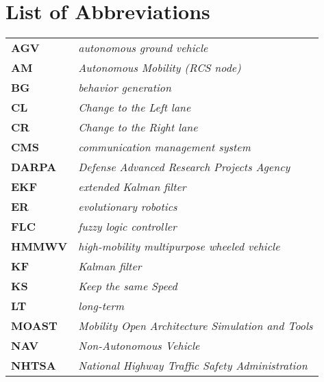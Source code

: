 \chapter*{List of Abbreviations}

\begin{table}[h!t!]
\begin{center}
\begin{small}
\begin{tabular}[t]{ll}
\textbf{\color{Black}AGV} & \textit{\color{DefColor}autonomous ground vehicle}\\
\textbf{\color{Black}AM} & \textit{\color{DefColor}Autonomous Mobility (RCS node)}\\
\textbf{\color{Black}BG} & \textit{\color{DefColor}behavior generation}\\
\textbf{\color{Black}CL} & \textit{\color{DefColor}Change to the Left lane}\\
\textbf{\color{Black}CR} & \textit{\color{DefColor}Change to the Right lane}\\
\textbf{\color{Black}CMS} & \textit{\color{DefColor}communication management system}\\
\textbf{\color{Black}DARPA} & \textit{\color{DefColor}Defense Advanced Research Projects Agency}\\
\textbf{\color{Black}EKF} & \textit{\color{DefColor}extended Kalman filter}\\
\textbf{\color{Black}ER} & \textit{\color{DefColor}evolutionary robotics}\\
\textbf{\color{Black}FLC} & \textit{\color{DefColor}fuzzy logic controller}\\
\textbf{\color{Black}HMMWV} & \textit{\color{DefColor}high-mobility multipurpose wheeled vehicle}\\
\textbf{\color{Black}KF} & \textit{\color{DefColor}Kalman filter}\\
\textbf{\color{Black}KS} & \textit{\color{DefColor}Keep the same Speed}\\
\textbf{\color{Black}LT} & \textit{\color{DefColor}long-term} \\
\textbf{\color{Black}MOAST} & \textit{\color{DefColor}Mobility Open Architecture Simulation and Tools}\\
\textbf{\color{Black}NAV} & \textit{\color{DefColor}Non-Autonomous Vehicle}\\
\textbf{\color{Black}NHTSA} & \textit{\color{DefColor}National Highway Traffic Safety Administration}\\

\end{tabular}
\end{small}
\end{center}
\end{table}
